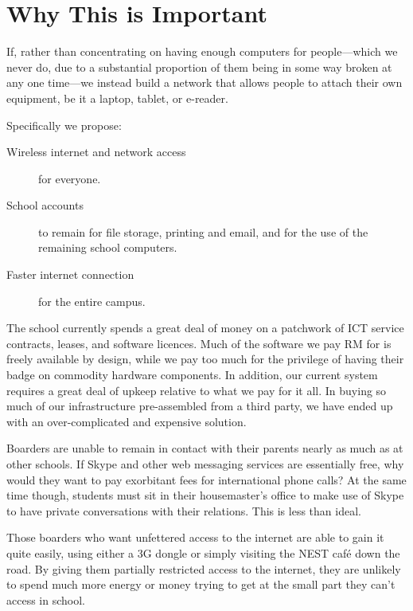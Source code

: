 \documentclass[a4paper,leqno,titlepage]{article}
\begin{document}
\break

\section{Why This is Important}


If, rather than concentrating on having enough computers for people---which we
never do, due to a substantial proportion of them being in some way broken
at any one time---we instead build a network that allows people to attach their
own equipment, be it a laptop, tablet, or e-reader.

Specifically we propose:
    
\begin{description}

\item[Wireless internet and network access] for everyone.
\item[School accounts] to remain for file storage, printing and email, and for
the use of the remaining school computers.
\item[Faster internet connection] for the entire campus.


\end{description}


The school currently spends a great deal of money on a patchwork of ICT
service contracts, leases, and software licences.
Much of the software we pay RM for is freely available by design, while we pay
too much for the privilege of having their badge on commodity hardware components.
In addition, our current system requires a great deal of upkeep relative to
what we pay for it all. In buying so much of our infrastructure pre-assembled
from a third party, we have ended up with an over-complicated and
expensive solution.


Boarders are unable to remain in contact with their parents nearly as much
as at other schools. If Skype and other web messaging services are essentially free, why
would they want to pay exorbitant fees for international phone calls?
At the same time though, students must sit in their housemaster's office to make
use of Skype to have private conversations with their relations.
This is less than ideal.


Those boarders who want unfettered access to the internet are
able to gain it quite easily, using either a 3G dongle or simply visiting the NEST
café down the road. By giving them partially restricted access to the internet,
they are unlikely to spend much more energy or money trying to get at the small part
they can't access in school.
\end{document}
